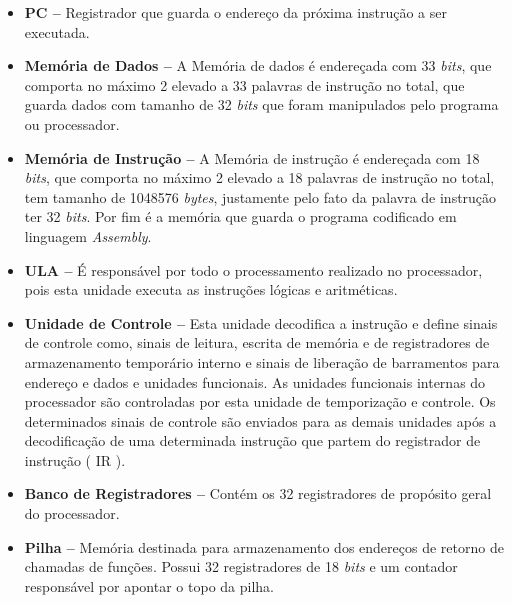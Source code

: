 \documentclass{report}
\begin{document}
  \begin{itemize}
    \item \textbf{PC --} Registrador que guarda o endereço da próxima instrução a ser executada.
    
    \item \textbf{Memória de Dados --} A Memória de dados é endereçada com 33 \textit{bits}, que comporta no máximo 2 elevado a 33 palavras de instrução no total, que guarda dados com tamanho de 32 \textit{bits} que foram manipulados pelo programa ou processador. 
   
    \item \textbf{Memória de Instrução --} A Memória de instrução é endereçada com 18 \textit{bits}, que comporta no máximo 2 elevado a 18 palavras de instrução no total, tem tamanho de 1048576 \textit{bytes}, justamente pelo fato da palavra de instrução ter 32 \textit{bits}. Por fim é a memória que guarda o programa codificado em linguagem \textit{Assembly}.
    
    \item \textbf{ULA --} É responsável por todo o processamento realizado no processador, pois esta unidade executa as instruções lógicas e aritméticas.
    
    \item \textbf{Unidade de Controle --} Esta unidade decodifica a instrução e define sinais de controle como, sinais de leitura, escrita de memória e de registradores de armazenamento temporário interno e sinais de liberação de barramentos para endereço e dados e unidades funcionais. As unidades funcionais internas do processador são controladas por esta unidade de temporização e controle. Os determinados sinais de controle são enviados para as demais unidades após a decodificação de uma determinada instrução que partem do registrador de instrução ( IR ).
    
    \item \textbf{Banco de Registradores --} Contém os 32 registradores de propósito geral do processador.
    
    \item \textbf{Pilha --} Memória destinada para armazenamento dos endereços de retorno de chamadas de funções. Possui 32 registradores de 18 \textit{bits} e um contador responsável por apontar o topo da pilha.
  \end{itemize}
  \newpage
  
\end{document}
